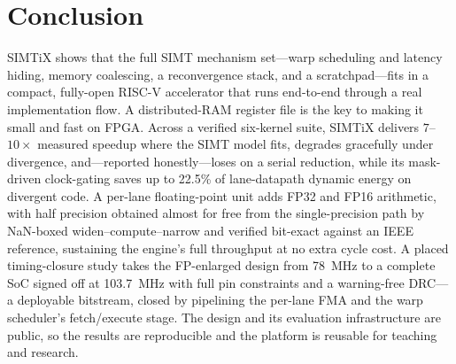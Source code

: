 \documentclass[conference]{IEEEtran}
\begin{document}
\section{Conclusion}
SIMTiX shows that the full SIMT mechanism set---warp scheduling and latency
hiding, memory coalescing, a reconvergence stack, and a scratchpad---fits in a
compact, fully-open RISC-V accelerator that runs end-to-end through a real
implementation flow. A distributed-RAM register file is the key to making it
small and fast on FPGA. Across a verified six-kernel suite, SIMTiX delivers
$7$--$10\times$ measured speedup where the SIMT model fits, degrades gracefully
under divergence, and---reported honestly---loses on a serial reduction, while
its mask-driven clock-gating saves up to 22.5\% of lane-datapath dynamic energy
on divergent code. A per-lane floating-point unit adds FP32 and FP16 arithmetic,
with half precision obtained almost for free from the single-precision path by
NaN-boxed widen--compute--narrow and verified bit-exact against an IEEE
reference, sustaining the engine's full throughput at no extra cycle cost. A
placed timing-closure study takes the FP-enlarged design from 78~MHz to a
complete SoC signed off at 103.7~MHz with full pin constraints and a
warning-free DRC---a deployable bitstream, closed by pipelining the per-lane FMA
and the warp scheduler's fetch/execute stage. The design and its evaluation
infrastructure are public, so
the results are reproducible and the platform is reusable for teaching and
research.
\end{document}
